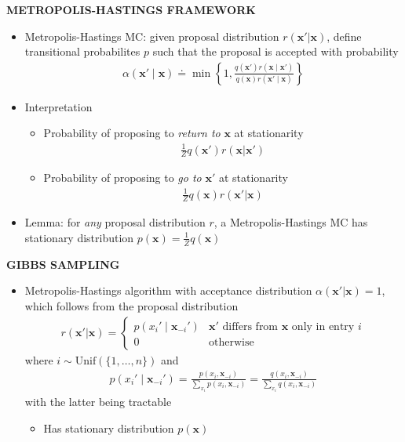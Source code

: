 \begin{whitebox}{\textbf{METROPOLIS-HASTINGS FRAMEWORK}}
    \begin{itemize}
        \item Metropolis-Hastings MC: given proposal distribution $r(\bm{x}'|\bm{x})$, define transitional probabilites $p$ such that the proposal is accepted with probability
        \begin{align*}
            \alpha(\bm{x}'\mid\bm{x})\doteq\min\left\{1,\frac{q(\bm{x}')r(\bm{x}\mid\bm{x}')}{q(\bm{x})r(\bm{x}'\mid\bm{x})}\right\}
        \end{align*}
        \item Interpretation
        \begin{itemize}
            \item Probability of proposing to \textit{return to} $\bm{x}$ at stationarity
            \begin{align*}
                \frac{1}{Z}q(\bm{x}')r(\bm{x}|\bm{x}')
            \end{align*}
            \item Probability of proposing to \textit{go to} $\bm{x}'$ at stationarity
            \begin{align*}
                \frac{1}{Z}q(\bm{x})r(\bm{x}'|\bm{x})
            \end{align*}
        \end{itemize}
        \item Lemma: for \textit{any} proposal distribution $r$, a Metropolis-Hastings MC has stationary distribution $p(\bm{x})=\frac{1}{Z}q(\bm{x})$
    \end{itemize}
\end{whitebox}

\begin{whitebox}{\textbf{GIBBS SAMPLING}}
    \begin{itemize}
        \item Metropolis-Hastings algorithm with acceptance distribution $\alpha(\bm{x}'|\bm{x})=1$, which follows from the proposal distribution
        \begin{align*}
            r(\bm{x}'|\bm{x})=
            \begin{cases}
                p(x_i'\mid\bm{x}_{-i}') & \bm{x}'\text{ differs from $\bm{x}$ only in entry $i$}\\
                0 & \text{otherwise}
            \end{cases}
        \end{align*}
        where $i\sim\mathrm{Unif}(\{1,\dots,n\})$ and
        \begin{align*}
            p(x_i'\mid\bm{x}_{-i}')=\frac{p(x_i,\bm{x}_{-i})}{\sum_{x_i}p(x_i,\bm{x}_{-i})}=\frac{q(x_i,\bm{x}_{-i})}{\sum_{x_i}q(x_i,\bm{x}_{-i})}
        \end{align*}
        with the latter being tractable
        \begin{itemize}
            \item Has stationary distribution $p(\bm{x})$
        \end{itemize}
    \end{itemize}
\end{whitebox}

